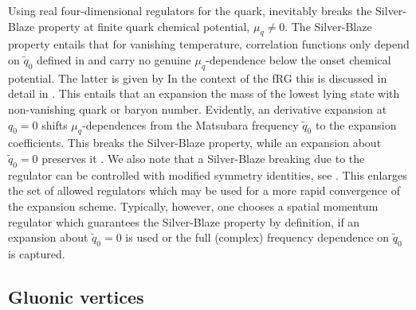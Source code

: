 \documentclass[aps,twocolumn,prd,superscriptaddress]{revtex4-2}
\begin{document}
Using real four-dimensional regulators for the quark, inevitably breaks the Silver-Blaze property at finite quark chemical potential, $\mu_q\neq0$. The Silver-Blaze property entails that for vanishing temperature, correlation functions only depend on $\tilde q_0$ defined in  and carry no genuine $\mu_q$-dependence below the onset chemical potential. The latter is given by 
In the context of the fRG this is discussed in detail in \cite{Khan:2015puu, Fu:2015naa}. This entails that an expansion the mass of the lowest lying state with non-vanishing quark or baryon number. Evidently, an derivative expansion at $q_0=0$ shifts $\mu_q$-dependences from the Matsubara frequency $\tilde q_0$ to the expansion coefficients. This breaks the Silver-Blaze property, while an expansion about $\tilde q_0=0$ preserves it \cite{Fu:2015naa}. We also note that a Silver-Blaze breaking due to the regulator can be controlled with modified symmetry identities, see \cite{Braun:2020bhy}. This enlarges the set of allowed regulators which may be used for a more rapid convergence of the expansion scheme. Typically, however, one chooses a spatial momentum regulator which guarantees the Silver-Blaze property by definition, if an expansion about $\tilde q_0=0$ is used or the full (complex) frequency dependence on $\tilde q_0$ is captured. 


\subsection{Gluonic vertices}
\label{app:AVertices}
\end{document}
